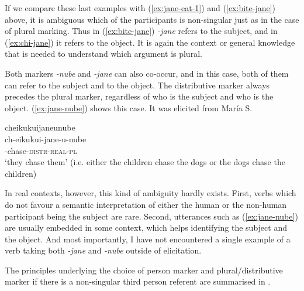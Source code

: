 If we compare these last examples with (\ref{ex:jane-eat-1}) and (\ref{ex:bite-jane}) above, it is ambiguous which of the participants is non-singular just as in the case of plural marking. Thus in (\ref{ex:bite-jane}) \textit{-jane} refers to the subject, and in (\ref{ex:chi-jane}) it refers to the object. It is again the context or general knowledge that is needed to understand which argument is plural.
 
Both markers \textit{-nube} and \textit{-jane} can also co-occur, and in this case, both of them can refer to the subject and to the object. The distributive marker always precedes the plural marker, regardless of who is the subject and who is the object. (\ref{ex:jane-nube}) shows this case. It was elicited from María S.

\ea\label{ex:jane-nube}
\begingl 
\glpreamble cheikukuijaneunube\\
\gla ch-eikukui-jane-u-nube\\ 
-chase-\textsc{distr}-\textsc{real}-\textsc{pl}\\ 
\glft ‘they chase them’ (i.e. either the children chase the dogs or the dogs chase the children)\\ 
\endgl
\trailingcitation{[rxx-e141230s.211]}
\xe
 
In real contexts, however, this kind of ambiguity hardly exists. First, verbs which do not favour a semantic interpretation of either the human or the non-human participant being the subject are rare. Second, utterances such as (\ref{ex:jane-nube}) are usually embedded in some context, which helps identifying the subject and the object. And most importantly, I have not encountered a single example of a verb taking both \textit{-jane} and \textit{-nube} outside of elicitation.

The principles underlying the choice of person marker and plural/distributive marker if there is a non-singular third person referent are summarised in .

